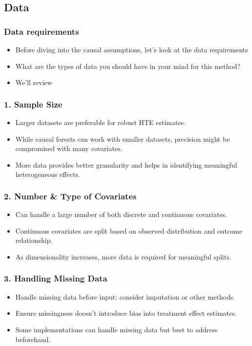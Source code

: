 \documentclass{beamer}
\begin{document}
\subsection{Data}

\begin{frame}
\frametitle{Data requirements}
\begin{itemize}
	\item Before diving into the causal assumptions, let's look at the data requirements
	\item What are the types of data you should have in your mind for this method?
	\item We'll review
\end{itemize}
\end{frame}

\begin{frame}
\frametitle{1. Sample Size}
\begin{itemize}
    \item Larger datasets are preferable for robust HTE estimates.
    \item While causal forests can work with smaller datasets, precision might be compromised with many covariates.
    \item More data provides better granularity and helps in identifying meaningful heterogeneous effects.
\end{itemize}
\end{frame}

\begin{frame}
\frametitle{2. Number \& Type of Covariates}
\begin{itemize}
    \item Can handle a large number of both discrete and continuous covariates.
    \item Continuous covariates are split based on observed distribution and outcome relationship.
    \item As dimensionality increases, more data is required for meaningful splits.
\end{itemize}
\end{frame}

\begin{frame}
\frametitle{3. Handling Missing Data}
\begin{itemize}
    \item Handle missing data before input: consider imputation or other methods.
    \item Ensure missingness doesn't introduce bias into treatment effect estimates.
    \item Some implementations can handle missing data but best to address beforehand.
\end{itemize}
\end{frame}
\end{document}
